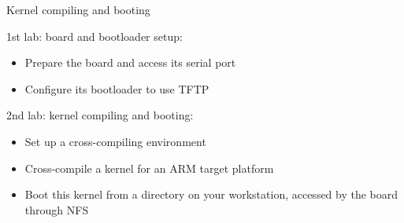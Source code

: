 \setuplabframe
{Kernel compiling and booting}
{
1st lab: board and bootloader setup:
  \begin{itemize}
  \item Prepare the board and access its serial port
  \item Configure its bootloader to use TFTP
  \end{itemize}
2nd lab: kernel compiling and booting:
  \begin{itemize}
  \item Set up a cross-compiling environment
  \item Cross-compile a kernel for an ARM target platform
  \item Boot this kernel from a directory on your workstation,
    accessed by the board through NFS
  \end{itemize}
}
